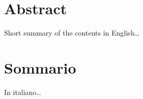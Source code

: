 \begingroup
\let\clearpage\relax
\let\cleardoublepage\relax
\let\cleardoublepage\relax

\chapter*{Abstract}
Short summary of the contents in English\dots


\vfill

\chapter*{Sommario}
In italiano\dots


\endgroup			

\vfill
